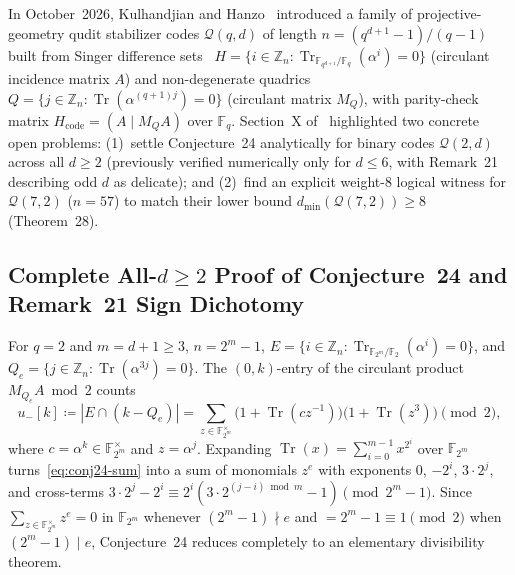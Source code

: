 \documentclass[11pt,letterpaper]{article}
\theoremstyle{plain}
\theoremstyle{definition}
\theoremstyle{remark}
\newcommand{\F}{\mathbb{F}}
\newcommand{\Z}{\mathbb{Z}}
\newcommand{\Tr}{\operatorname{Tr}}
\newcommand{\Qcode}{\mathcal{Q}}
\begin{document}
In October~2026, Kulhandjian and Hanzo~\cite{KulhandjianHanzo2026} introduced a family of projective-geometry qudit stabilizer codes $\Qcode(q,d)$ of length $n=(q^{d+1}-1)/(q-1)$ built from Singer difference sets~\cite{Singer1938} $H=\{i\in\Z_n : \Tr_{\F_{q^{d+1}}/\F_q}(\alpha^i)=0\}$ (circulant incidence matrix $A$) and non-degenerate quadrics $Q=\{j\in\Z_n : \Tr(\alpha^{(q+1)j})=0\}$ (circulant matrix $M_Q$), with parity-check matrix $H_{\mathrm{code}}=(A\mid M_Q A)$ over $\F_q$. Section~X of~\cite{KulhandjianHanzo2026} highlighted two concrete open problems: (1)~settle Conjecture~24 analytically for binary codes $\Qcode(2,d)$ across all $d\ge 2$ (previously verified numerically only for $d\le 6$, with Remark~21 describing odd $d$ as delicate); and (2)~find an explicit weight-$8$ logical witness for $\Qcode(7,2)$ ($n=57$) to match their lower bound $d_{\min}(\Qcode(7,2))\ge 8$ (Theorem~28).

\subsection{Complete All-\texorpdfstring{$d\ge 2$}{d>=2} Proof of Conjecture~24 and Remark~21 Sign Dichotomy}

For $q=2$ and $m=d+1\ge 3$, $n=2^m-1$, $E=\{i\in\Z_n:\Tr_{\F_{2^m}/\F_2}(\alpha^i)=0\}$, and $Q_e=\{j\in\Z_n:\Tr(\alpha^{3j})=0\}$. The $(0,k)$-entry of the circulant product $M_{Q_e}A\bmod 2$ counts
\begin{equation}
\label{eq:conj24-sum}
  u_-[k] \coloneqq |E\cap(k-Q_e)|
  = \sum_{z\in\F_{2^m}^\times}\bigl(1+\Tr(c z^{-1})\bigr)\bigl(1+\Tr(z^3)\bigr) \pmod 2,
\end{equation}
where $c=\alpha^k\in\F_{2^m}^\times$ and $z=\alpha^j$. Expanding $\Tr(x)=\sum_{i=0}^{m-1}x^{2^i}$ over $\F_{2^m}$ turns~\eqref{eq:conj24-sum} into a sum of monomials $z^e$ with exponents $0$, $-2^i$, $3\cdot 2^j$, and cross-terms $3\cdot 2^j - 2^i \equiv 2^i(3\cdot 2^{(j-i)\bmod m}-1)\pmod{2^m-1}$. Since $\sum_{z\in\F_{2^m}^\times} z^e=0$ in $\F_{2^m}$ whenever $(2^m-1)\nmid e$ and $=2^m-1\equiv 1\pmod 2$ when $(2^m-1)\mid e$, Conjecture~24 reduces completely to an elementary divisibility theorem.
\end{document}
